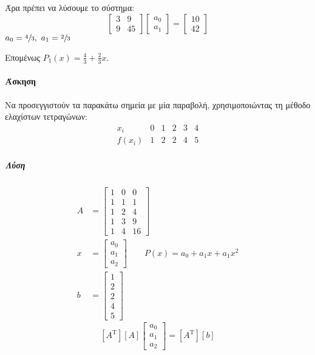 \documentclass[11pt,a4paper,notitlepage,fleqn,final]{article}
\begin{document}
    Άρα πρέπει να λύσουμε το σύστημα:
    \[
    \left[\begin{matrix}
    3 & 9 \\ 9 & 45
    \end{matrix}\right] \left[\begin{matrix}
    a_0 \\ a_1
    \end{matrix}\right] = \left[\begin{matrix}
    10 \\ 42
    \end{matrix}\right]
    \]
    \( a_0 = \sfrac{4}{3},\ a_1 = \sfrac{2}{3}  \)

    Επομένως \( \displaystyle P_1(x) = \frac{4}{3} + \frac{2}{3}x \).

    \paragraph{Άσκηση}
    Να προσεγγιστούν τα παρακάτω σημεία με μία παραβολή, χρησιμοποιώντας
    τη μέθοδο ελαχίστων τετραγώνων:
    \[
    \begin{array}{r|ccccc}
    x_i & 0 & 1 & 2 & 3 & 4 \\ \hline
    f(x_i) & 1 & 2 & 2 & 4 & 5
    \end{array}
    \]

	\subparagraph{Λύση}
    \begin{align*}
    	A &= \left[\begin{matrix}
   	    1 & 0 & 0 \\ 1 & 1 & 1 \\ 1 & 2 & 4 \\ 1 & 3 & 9 \\ 1 & 4 & 16
    	\end{matrix}\right] \\
    	x &= \left[\begin{matrix}
    	a_0 \\ a_1 \\ a_2
    	\end{matrix}\right] \qquad P(x) = a_0+a_1x+a_1x^2 \\
    	b &= \left[
    	\begin{matrix}
    	1 \\ 2 \\ 2 \\ 4 \\ 5
    	\end{matrix}
    	\right]
    \end{align*}
    \[
    \left[
    A^{\mathrm T}
    \right] \left[ A \right]\left[
    \begin{matrix}
    a_0 \\ a_1 \\ a_2
    \end{matrix}
    \right] = \left[A^{\mathrm T}\right] \left[b\right]
    \]
\end{document}
